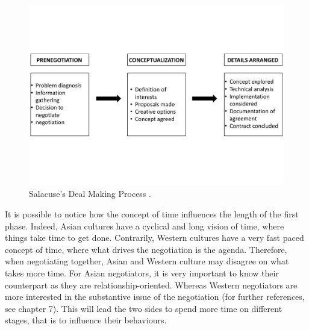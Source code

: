 \documentclass[../main.tex]{subfiles}
\begin{document}
\begin{figure}[h!]
    \centering
    \includegraphics[trim={0 4,5cm 0 4,5cm},clip, width=\textwidth]{images/salacuse.pdf}
    \caption{Salacuse's Deal Making Process \mancite\autocite[19]{salacuse1}.}
\end{figure}

It is possible to notice how the concept of time influences the length of the first phase. Indeed, Asian cultures have a cyclical and long vision of time, where things take time to get done. Contrarily, Western cultures have a very fast paced concept of time, where what drives the negotiation is the agenda. Therefore, when negotiating together, Asian and Western culture may disagree on what takes more time. For Asian negotiators, it is very important to know their counterpart as they are relationship-oriented. Whereas Western negotiators are more interested in the substantive issue of the negotiation (for further references, see chapter 7). This will lead the two sides to spend more time on different stages, that is to influence their behaviours.\\
 
\end{document}
